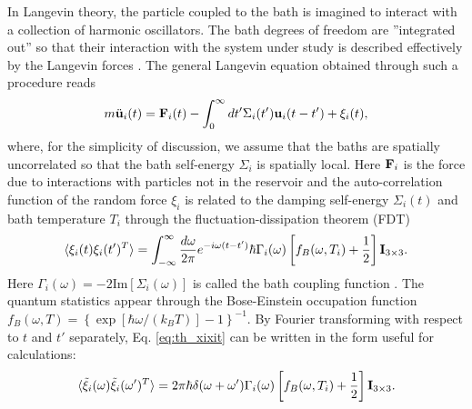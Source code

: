 In Langevin theory, the particle coupled to the bath is imagined to interact with a collection of harmonic oscillators. The bath degrees of freedom are ''integrated out'' so that their interaction with the system under study is described effectively by the Langevin forces \cite{weiss}. The general Langevin equation obtained through such a procedure reads \cite{dhar06}
\begin{equation}
 m\ddot{\mathbf{u}}_i(t) =  \mathbf{F}_i(t) - \int_{0}^{\infty}dt' \Sigma_i(t') \mathbf{u}_i(t-t') + \xi_i(t), \label{eq:th_eom_langevin}
\end{equation}
where, for the simplicity of discussion, we assume that the baths are spatially uncorrelated so that the bath self-energy $\Sigma_i$ is spatially local. Here $\mathbf{F}_i$ is the force due to interactions with particles not in the reservoir and the auto-correlation function of the random force $\xi_i$ is related to the damping self-energy $\Sigma_i(t)$ and bath temperature $T_i$ through the fluctuation-dissipation theorem (FDT) \cite{dhar06}
\begin{equation}
 \langle \xi_i(t)\xi_i(t') ^T\rangle = \int_{-\infty}^{\infty} \frac{d\omega}{2\pi} e^{-i\omega(t-t')} \hbar \Gamma_i(\omega) \left[f_B(\omega,T_i)+\frac{1}{2}\right] \mathbf{I}_{3\times3}. \label{eq:th_xixit}
\end{equation}
Here $\Gamma_i(\omega)=-2\textrm{Im}[\Sigma_i(\omega)]$ is called the bath coupling function \cite{dhar06}. The quantum statistics appear through the Bose-Einstein occupation function $f_B(\omega,T)=\left\{\exp[\hbar\omega/(k_BT)]-1 \right\}^{-1}$. By Fourier transforming with respect to $t$ and $t'$ separately, Eq. \eqref{eq:th_xixit} can be written in the form useful for calculations:
\begin{equation}
  \langle\tilde  \xi_i(\omega)\tilde \xi_i(\omega')^T \rangle = 2\pi\hbar\delta(\omega+\omega') \Gamma_i(\omega) \left[f_B(\omega,T_i)+\frac{1}{2} \right] \mathbf{I}_{3\times3}. \label{eq:th_xixiom}
\end{equation}

